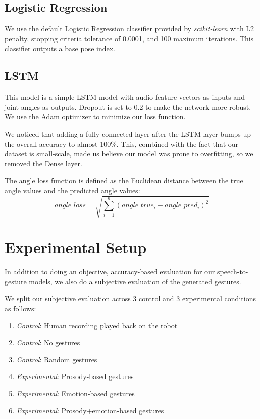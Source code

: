 \subsection{Logistic Regression}
We use the default Logistic Regression classifier provided by \textit{scikit-learn} with L2 penalty, stopping criteria tolerance of 0.0001, and 100 maximum iterations. This classifier outputs a base pose index.

\subsection{LSTM}
This model is a simple LSTM model with audio feature vectors as inputs and joint angles as outputs. Dropout is set to 0.2 to make the network more robust. We use the Adam optimizer to minimize our loss function.

We noticed that adding a fully-connected layer after the LSTM layer bumps up the overall accuracy to almost 100\%. This, combined with the fact that our dataset is small-scale, made us believe our model was prone to overfitting, so we removed the Dense layer. 

The angle loss function is defined as the Euclidean distance between the true angle values and the predicted angle values:
\begin{displaymath}
angle\_loss = \sqrt{\sum_{i=1}^n (angle\_true_i - angle\_pred_i)^2}
\end{displaymath}
\section{Experimental Setup}
In addition to doing an objective, accuracy-based evaluation for our speech-to-gesture models, we also do a subjective evaluation of the generated gestures.

We split our subjective evaluation across 3 control and 3 experimental conditions as follows:
\begin{enumerate}
\item \textit{Control}: Human recording played back on the robot
\item \textit{Control}: No gestures
\item \textit{Control}: Random gestures
\item \textit{Experimental}: Prosody-based gestures
\item \textit{Experimental}: Emotion-based gestures
\item \textit{Experimental}: Prosody+emotion-based gestures
\end{enumerate}
